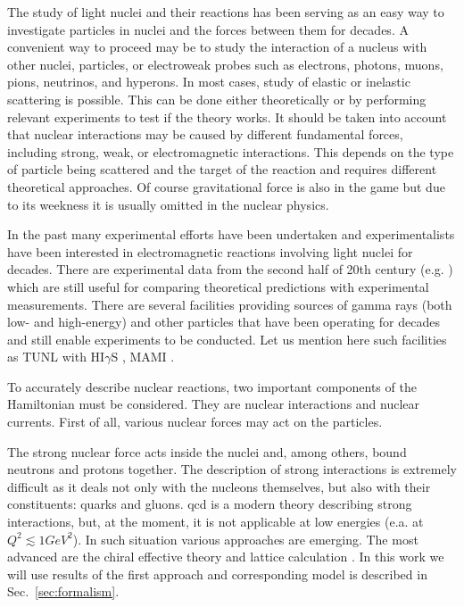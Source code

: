 The study of light nuclei and their reactions has been serving as an easy way to investigate particles in nuclei and
the forces between them for decades. A convenient way to proceed may be to study the interaction of a nucleus with
other nuclei, particles, or electroweak probes such as electrons, photons, muons, pions, neutrinos, and hyperons.
In most cases, study of elastic or inelastic scattering is possible. This can be done either theoretically or by
performing relevant experiments to test if the theory works. It should be taken into account that nuclear 
interactions may be
caused by different fundamental forces, including strong, weak, or electromagnetic
interactions. This depends on the type of particle being scattered and the target of the reaction
and requires different theoretical approaches.
Of course gravitational force is also in the game but due to its weekness it is 
usually omitted in the nuclear physics. 

In the past many experimental efforts have been undertaken and
experimentalists have been interested in electromagnetic reactions involving light nuclei for decades.
There are experimental data from the second half of 20th century 
(e.g. \cite{Skopik1974, Liuexp68, Kose1969MeasurementsOT, Kamae}) which are still 
useful for comparing theoretical predictions with experimental measurements.    
There are several facilities providing sources of gamma rays (both low- and high-energy)
and other particles that have been operating for decades and still enable experiments to be conducted.
Let us mention here such facilities as TUNL with HI$\gamma$S \cite{TUNL, TONCHEV2005170}, MAMI \cite{MAMI}. 

To accurately describe nuclear reactions, two important components of the Hamiltonian must be considered.
They are nuclear interactions and nuclear currents.
First of all, various nuclear forces may act on
the particles.

The strong nuclear force acts inside the nuclei and, among others, bound neutrons 
and protons together. The description of strong interactions is extremely
difficult as it deals not only with the nucleons themselves, but also with their constituents: quarks
and gluons. \gls{qcd} is a modern theory
describing strong interactions, but, at the moment,
it is not applicable at low energies (e.a. at $Q^2 \lesssim 1 GeV^2$).
In such situation various approaches are emerging.
The most advanced are the
chiral effective theory and lattice calculation \cite{IOFFE2006232, BEANElaticce, Machleidt2011}.
In this work we will use results of the first approach
and corresponding model is described in Sec.~\ref{sec:formalism}.

